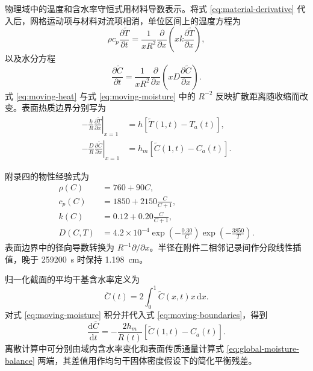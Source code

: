 \documentclass[withoutpreface,bwprint]{cumcmthesis}
\begin{document}
物理域中的温度和含水率守恒式用材料导数表示。将式 \ref{eq:material-derivative} 代入后，网格运动项与材料对流项相消，单位区间上的温度方程为
\begin{equation}
\rho c_p\frac{\partial \widetilde{T}}{\partial t}
=
\frac{1}{xR^2}
\frac{\partial}{\partial x}
\left(
xk\frac{\partial \widetilde{T}}{\partial x}
\right),
\label{eq:moving-heat}
\end{equation}
以及水分方程
\begin{equation}
\frac{\partial \widetilde{C}}{\partial t}
=
\frac{1}{xR^2}
\frac{\partial}{\partial x}
\left(
xD\frac{\partial \widetilde{C}}{\partial x}
\right).
\label{eq:moving-moisture}
\end{equation}
式 \ref{eq:moving-heat} 与式 \ref{eq:moving-moisture} 中的 \(R^{-2}\) 反映扩散距离随收缩而改变。表面热质边界分别写为
\begin{align}
-\frac{k}{R}\left.\frac{\partial\widetilde{T}}{\partial x}\right|_{x=1}
&=h\left[\widetilde{T}(1,t)-T_a(t)\right],\\
-\frac{D}{R}\left.\frac{\partial\widetilde{C}}{\partial x}\right|_{x=1}
&=h_m\left[\widetilde{C}(1,t)-C_a(t)\right].
\label{eq:moving-boundaries}
\end{align}

附录四的物性经验式为
\begin{align}
\rho(C)&=760+90C,\\
c_p(C)&=1850+2150\frac{C}{C+1},\\
k(C)&=0.12+0.20\frac{C}{C+1},\\
D(C,T)&=4.2\times10^{-4}
\exp\left(-\frac{0.30}{C}\right)
\exp\left(-\frac{3850}{T}\right).
\label{eq:q4-properties}
\end{align}
表面边界中的径向导数转换为 \(R^{-1}\partial/\partial x\)。半径在附件二相邻记录间作分段线性插值，晚于 \SI{259200}{s} 时保持 \SI{1.198}{cm}。

归一化截面的平均干基含水率定义为
\begin{equation}
\overline{C}(t)=2\int_0^1\widetilde{C}(x,t)x\,\mathrm{d}x.
\label{eq:mean-moisture}
\end{equation}
对式 \ref{eq:moving-moisture} 积分并代入式 \ref{eq:moving-boundaries}，得到
\begin{equation}
\frac{\mathrm{d}\overline{C}}{\mathrm{d}t}
=-\frac{2h_m}{R(t)}
\left[\widetilde{C}(1,t)-C_a(t)\right].
\label{eq:global-moisture-balance}
\end{equation}
离散计算中可分别由域内含水率变化和表面传质通量计算式 \ref{eq:global-moisture-balance} 两端，其差值用作均匀干固体密度假设下的简化平衡残差。
\end{document}
